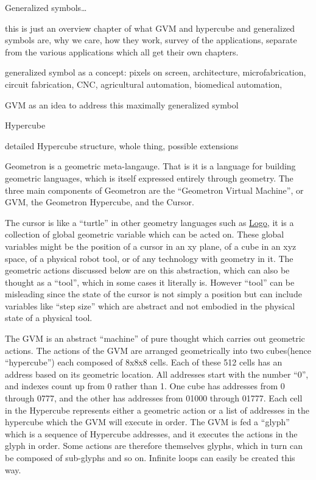 Generalized symbols\ldots{}

    this is just an overview chapter of what GVM and hypercube and generalized symbols are, why we care, how they work, survey of the applications, separate from the various applications which all get their own chapters.


generalized symbol as a concept: pixels on screen, architecture, microfabrication, circuit fabrication, CNC, agricultural automation, biomedical automation,

GVM as an idea to address this maximally generalized symbol

Hypercube

detailed Hypercube structure, whole thing, possible extensions



  Geometron is a geometric meta-langauge. That is it is a language for
building geometric languages, which is itself expressed entirely through
geometry. The three main components of Geometron are the ``Geometron
Virtual Machine'', or GVM, the Geometron Hypercube, and the Cursor.

The cursor is like a ``turtle'' in other geometry languages such as
\href{https://en.wikipedia.org/wiki/Logo_(programming_language)}{Logo},
it is a collection of global geometric variable which can be acted on.
These global variables might be the position of a cursor in an xy plane,
of a cube in an xyz space, of a physical robot tool, or of any
technology with geometry in it. The geometric actions discussed below
are on this abstraction, which can also be thought as a ``tool'', which
in some cases it literally is. However ``tool'' can be misleading since
the state of the cursor is not simply a position but can include
variables like ``step size'' which are abstract and not embodied in the
physical state of a physical tool.

The GVM is an abstract ``machine'' of pure thought which carries out
geometric actions. The actions of the GVM are arranged geometrically
into two cubes(hence ``hypercube'') each composed of 8x8x8 cells. Each
of these 512 cells has an address based on its geometric location. All
addresses start with the number ``0'', and indexes count up from 0
rather than 1. One cube has addresses from 0 through 0777, and the other
has addresses from 01000 through 01777. Each cell in the Hypercube
represents either a geometric action or a list of addresses in the
hypercube which the GVM will execute in order. The GVM is fed a
``glyph'' which is a sequence of Hypercube addresses, and it executes
the actions in the glyph in order. Some actions are therefore themselves
glyphs, which in turn can be composed of sub-glyphs and so on. Infinite
loops can easily be created this way.

